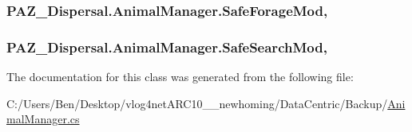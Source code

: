 \hypertarget{class_p_a_z___dispersal_1_1_animal_manager_afe6369c205861a8ec2619a5daf5fafba}{
\subsubsection[{Safe\-Forage\-Mod}]{ P\-A\-Z\-\_\-\-Dispersal.\-Animal\-Manager.\-Safe\-Forage\-Mod\hspace{0.3cm}{\ttfamily [get]}, {\ttfamily [set]}}}\label{class_p_a_z___dispersal_1_1_animal_manager_afe6369c205861a8ec2619a5daf5fafba}
\hypertarget{class_p_a_z___dispersal_1_1_animal_manager_afb2e89348ea699493280da66806414de}{
\subsubsection[{Safe\-Search\-Mod}]{ P\-A\-Z\-\_\-\-Dispersal.\-Animal\-Manager.\-Safe\-Search\-Mod\hspace{0.3cm}{\ttfamily [get]}, {\ttfamily [set]}}}\label{class_p_a_z___dispersal_1_1_animal_manager_afb2e89348ea699493280da66806414de}


The documentation for this class was generated from the following file\-:\begin{DoxyCompactItemize}
\item 
C\-:/\-Users/\-Ben/\-Desktop/vlog4net\-A\-R\-C10\-\_\-\_\-newhoming/\-Data\-Centric/\-Backup/\hyperlink{_backup_2_animal_manager_8cs}{Animal\-Manager.\-cs}\end{DoxyCompactItemize}
